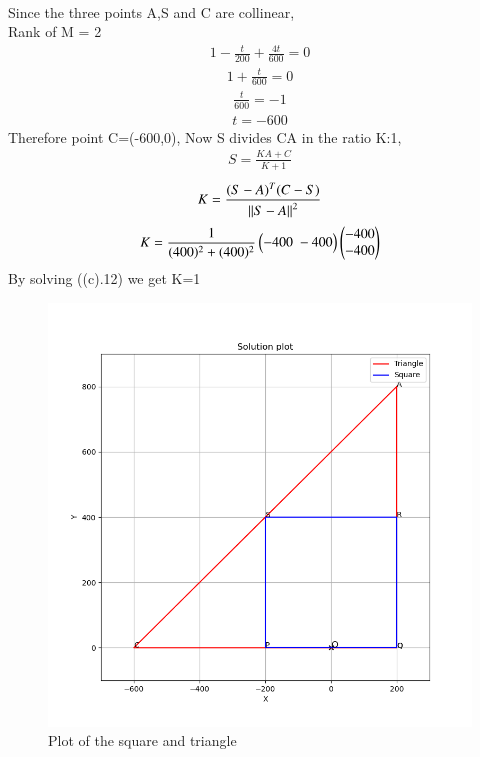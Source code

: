 \documentclass[journal]{IEEEtran}
\begin{document}
\begin{enumerate}[label=(\alph*)]
\begin{align}
            \end{align}
            Since the three points A,S and C are collinear,\\
            Rank of M = 2
            \begin{align}
                1-\frac{t}{200}+\frac{4t}{600} = 0
            \end{align}
            \begin{align}
                1 + \frac{t}{600} = 0
            \end{align}
            \begin{align}
                \frac{t}{600}=-1
            \end{align}
            \begin{align}
                t= -600
            \end{align}
            Therefore point C=(-600,0), Now S divides CA in the ratio K:1,
            \begin{align}
                S = \frac{KA+C}{K+1}
            \end{align}
            \begin{align}
                K=\frac{(S-A)^T(C-S)}{\left\lVert S-A\right\rVert^2}
            \end{align}
            \begin{align}
                K=\frac{1}{(400)^2+(400)^2}\begin{pmatrix}-400\;-400\end{pmatrix}\begin{pmatrix}-400\\-400\end{pmatrix}
            \end{align}
            By solving ((c).12) we get K=1
        \end{enumerate}
        \begin{figure}[h]
            \centering
            \includegraphics[width=0.8\linewidth]{figs/fig1.png}
            \caption{Plot of the square and triangle}
            \label{fig1}
        \end{figure}
\end{document}

